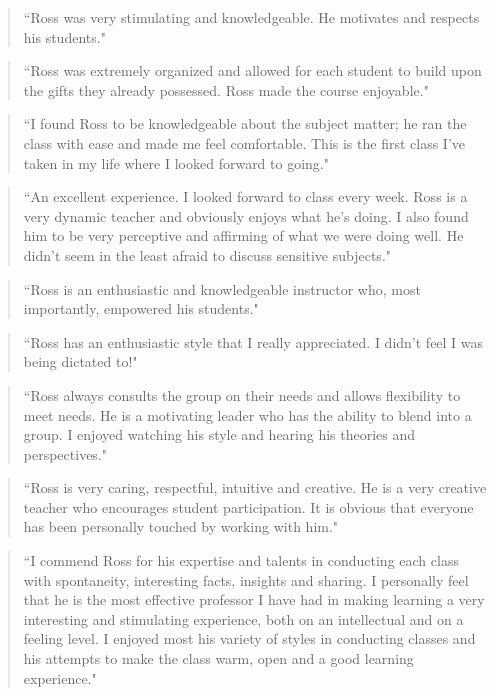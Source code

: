 \documentclass[10pt,DIV09,letterpaper,oneside,headsepline]{scrreprt}
\begin{document}
\begin{quote} ``Ross was very stimulating and knowledgeable. He motivates and respects his students." \end{quote}

\begin{quote} ``Ross was extremely organized and allowed for each student to build upon the gifts they already possessed. Ross made the course enjoyable." \end{quote}

\begin{quote} ``I found Ross to be knowledgeable about the subject matter; he ran the class with ease and made me feel comfortable. This is the first class I've taken in my life where I looked forward to going." \end{quote}

\begin{quote} ``An excellent experience. I looked forward to class every week. Ross is a very dynamic teacher and obviously enjoys what he's doing. I also found him to be very perceptive and affirming of what we were doing well. He didn't seem in the least afraid to discuss sensitive subjects." \end{quote}

\begin{quote} ``Ross is an enthusiastic and knowledgeable instructor who, most importantly, empowered his students." \end{quote}

\begin{quote} ``Ross has an enthusiastic style that I really appreciated. I didn't feel I was being dictated to!" \end{quote}

\begin{quote} ``Ross always consults the group on their needs and allows flexibility to meet needs. He is a motivating leader who has the ability to blend into a group. I enjoyed watching his style and hearing his theories and perspectives." \end{quote}

\begin{quote} ``Ross is very caring, respectful, intuitive and creative. He is a very creative teacher who encourages student participation. It is obvious that everyone has been personally touched by working with him." \end{quote}

\begin{quote} ``I commend Ross for his expertise and talents in conducting each class with spontaneity, interesting facts, insights and sharing. I personally feel that he is the most effective professor I have had in making learning a very interesting and stimulating experience, both on an intellectual and on a feeling level. I enjoyed most his variety of styles in conducting classes and his attempts to make the class warm, open and a good learning experience." \end{quote}
\end{document}
